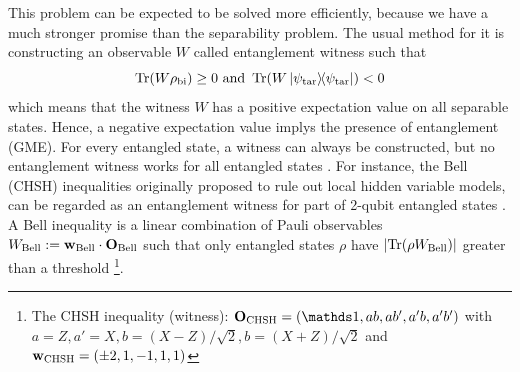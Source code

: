 \documentclass[
aps,
pra,
twocolumn,
floatfix,
]{revtex4-2}
\theoremstyle{plain}
\theoremstyle{definition}
\newtheorem{definition}{Definition}
\newtheorem{remark}{Remark}
\newcommand{\ew}{W}
\newcommand{\pob}{O}
\newcommand{\dm}{\rho}
\newcommand{\bi}{\text{bi}}
\newcommand{\target}{\textup{tar}}
\newcommand{\chsh}{\textup{CHSH}}
\newcommand{\bellineq}{\textup{Bell}}
\newcommand{\px}{X}
\newcommand{\pz}{Z}
\begin{document}
This problem can be expected to be solved more efficiently, because we have a much stronger promise than the separability problem.
The usual method for it is constructing an observable $W$ called entanglement witness such that
\begin{equation}
	\Tr(\ew\dm_{\bi}) \ge 0  \text{ and }
	\Tr(\ew\op{\psi_{\target}}) < 0 
	\label{eq:witness}
\end{equation}
which means that the witness $W$ has a positive expectation value on all separable states. 
Hence, a negative expectation value implys the presence of entanglement (GME).
For every entangled state, a witness can always be constructed,
but no entanglement witness works for all entangled states \cite{heinosaariMathematicalLanguageQuantum2011}.
For instance, the Bell (CHSH) inequalities originally proposed to rule out local hidden variable models,
can be regarded as an entanglement witness for part of 2-qubit entangled states \cite{terhalBellInequalitiesSeparability2000}.
A Bell inequality is a linear combination of Pauli observables $\ew_{\bellineq}:=\vb{w}_{\bellineq}\cdot\vb{\pob}_{\bellineq}$
such that only entangled states $\dm$ have $\abs{\Tr(\dm\ew_{\bellineq})}$ greater than a threshold
\footnote{
	The CHSH inequality (witness):
	$\vb{\pob}_{\chsh}=\qty(\identity, a b, a b', a' b, a' b' )$ with 
	$a = \pz, a' = \px, b = (\px-\pz)/\sqrt{2}, b = (\px+\pz)/\sqrt{2}$
	and $\vb{w}_{\chsh} = \qty(\pm 2, 1, -1, 1, 1)$
}.
\end{document}
